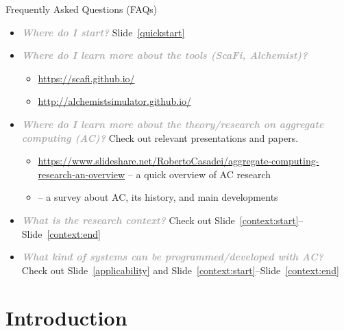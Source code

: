 \documentclass[presentation, 9pt]{beamer}\mode<presentation>{\usetheme{AMSBolognaFC}}
\newcommand{\bo}[1]{\textbf{#1}}
\newcommand{\question}[1]{\textcolor{darkgray}{\emph{\bo{#1}}}}
\newcommand{\refslide}[1]{Slide~\ref{#1}}
\begin{document}
\begin{frame}[fragile]{Frequently Asked Questions (FAQs)}

\begin{itemize}
\item \question{Where do I start?} \refslide{quickstart}

\item \question{Where do I learn more about the tools (ScaFi, Alchemist)?}
	\begin{itemize}
	\item \url{https://scafi.github.io/}
	\item \url{http://alchemistsimulator.github.io/}
	\end{itemize}
	
\item \question{Where do I learn more about the theory/research on aggregate computing (AC)?} Check out relevant presentations and papers.
	\begin{itemize}
	\item \url{https://www.slideshare.net/RobertoCasadei/aggregate-computing-research-an-overview} -- a quick overview of AC research
	\item {} -- a survey about AC, its history, and main developments
	\end{itemize}

\item \question{What is the research context?} Check out \refslide{context:start}--\refslide{context:end}

\item \question{What kind of systems can be programmed/developed with AC?} Check out \refslide{applicability} and \refslide{context:start}--\refslide{context:end}

\end{itemize}

\end{frame}

\section{Introduction}
\end{document}
